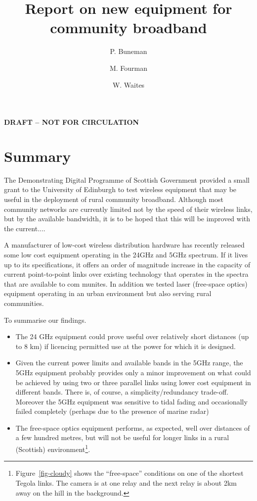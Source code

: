 \documentclass{amsart}
\title{Report on new equipment for community broadband}
\author{P. Buneman \and M. Fourman \and W. Waites}
\begin{document}
\begin{center}
  {\Huge\textbf{\color{red}DRAFT -- NOT FOR CIRCULATION}}
\end{center}
\maketitle
\tableofcontents
\section{Summary}
The Demonstrating Digital Programme of Scottish Government provided a small grant to the
University of Edinburgh to test wireless equipment that may be useful in the
deployment of rural community broadband.  Although most community
networks are currently limited not by the speed of their wireless
links, but by the available bandwidth, it is to be hoped that this
will be improved with the current....

A manufacturer of low-cost wireless distribution hardware has recently
released some low cost equipment operating in the 24GHz and 5GHz
spectrum.  If it lives up to its specifications, it offers an order of
magnitude increase in the capacity of current point-to-point links
over existing technology that operates in the spectra that are
available to com
munites.  In addition we tested laser (free-space
optics) equipment operating in an urban environment but also serving
rural communities.

To summarise our findings.
\begin{itemize}
\item The 24 GHz equipment could prove useful over relatively short
distances (up to 8 km) if licencing permitted use at the power for
which it is designed.

\item Given the current power limits and available bands in the 
5GHz range, the 5GHz equipment probably provides only a minor
improvement on what could be achieved by using two or three parallel
links using lower cost equipment in different bands.  There is, of
course, a simplicity/redundancy trade-off. Moreover the 5GHz equipment
was sensitive to tidal fading and occasionally failed completely (perhaps
due to the presence of marine radar)

\item The free-space optics equipment performs, as expected, well over
  distances of a few hundred metres, but will not be useful for longer
  links in a rural (Scottish)
  environment\footnote{Figure~\ref{fig-cloudy} shows the ``free-space''
    conditions on one of the shortest Tegola links.  The camera is at one relay
    and the next relay is about 2km away on the hill in the background.}.
\end{itemize}
\end{document}
